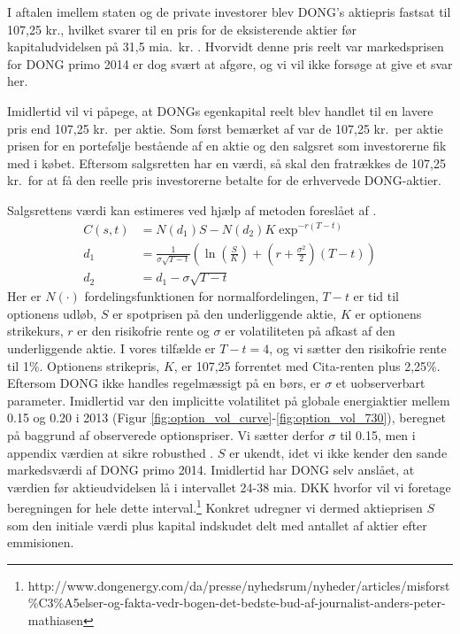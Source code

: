 \documentclass{article}
\begin{document}
I aftalen imellem staten og de private investorer blev  DONG's aktiepris fastsat til 107,25 kr., hvilket svarer til en pris for de eksisterende aktier før kapitaludvidelsen på 31,5 mia.\ kr. \citep{FM2013a}. Hvorvidt denne pris reelt var markedsprisen for DONG primo 2014 er dog svært at afgøre, og vi vil ikke forsøge at give et svar her. 

Imidlertid vil vi påpege, at DONGs egenkapital reelt blev handlet til en lavere pris end 107,25 kr.\ per aktie. Som først bemærket af \cite{Moeller2014} var de 107,25 kr.\ per aktie prisen for en portefølje bestående af en aktie og den salgsret som investorerne fik med i købet. Eftersom salgsretten har en værdi, så skal den fratrækkes de 107,25 kr.\ for at få den reelle pris investorerne betalte for de erhvervede DONG-aktier.

Salgsrettens værdi kan estimeres ved hjælp af metoden foreslået af \cite{Black1973}. 
\begin{align}
C(s,t)&=N(d_1)S-N(d_2)K \exp^{-r(T-t)} \label{eq:BS}\\
d_1&= \frac{1}{\sigma\sqrt{T-t}}\left( \ln\left( \frac{S}{K} \right)+\left(r+\frac{\sigma^2}{2} \right)(T-t) \right) \nonumber \\
d_2&=d_1-\sigma \sqrt{T-t} \nonumber
\end{align}
Her er $N(\cdot)$ fordelingsfunktionen for normalfordelingen, $T-t$ er tid til optionens udløb, $S$ er spotprisen på den underliggende aktie, $K$ er optionens strikekurs, $r$ er den risikofrie rente og $\sigma$ er volatiliteten på afkast af den underliggende aktie. I vores tilfælde er $T-t=4$, og vi sætter den risikofrie rente til 1\%. Optionens strikepris, $K$, er 107,25 forrentet med Cita-renten plus 2,25\%. Eftersom DONG ikke handles regelmæssigt på en børs, er $\sigma$ et uobserverbart parameter. Imidlertid var den implicitte volatilitet på globale energiaktier mellem 0.15 og 0.20 i 2013 (Figur \ref{fig:option_vol_curve}-\ref{fig:option_vol_730}), beregnet på baggrund af observerede optionspriser. Vi sætter derfor $\sigma$ til 0.15, men i appendix værdien at sikre robusthed . $S$ er ukendt, idet vi ikke kender den sande markedsværdi af DONG primo 2014. Imidlertid har DONG selv anslået, at værdien før aktieudvidelsen lå i intervallet 24-38 mia. DKK hvorfor vil vi foretage beregningen for hele dette interval.\footnote{http://www.dongenergy.com/da/presse/nyhedsrum/nyheder/articles/misforst\%C3\%A5elser-og-fakta-vedr-bogen-det-bedste-bud-af-journalist-anders-peter-mathiasen} Konkret udregner vi dermed aktieprisen $S$ som den initiale værdi plus kapital indskudet delt med antallet af aktier efter emmisionen. 
\end{document}
